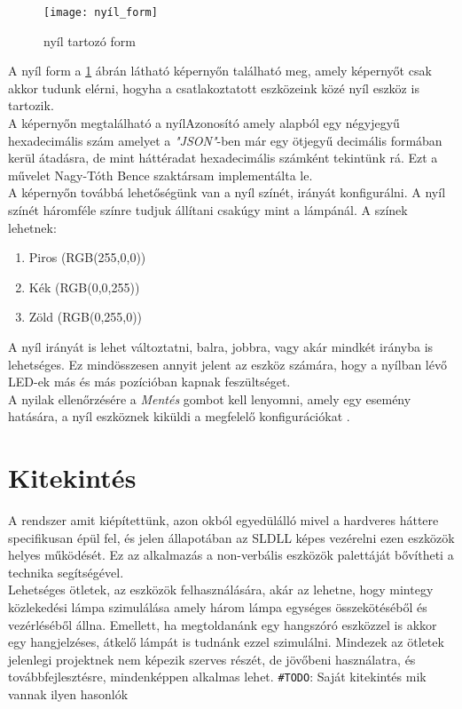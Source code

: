 \documentclass[tocnopagenum]{thesis-ekf}
\theoremstyle{definition}
\theoremstyle{remark}
\begin{document}
	\begin{figure}[h!]	
		\centering
		\texttt{[image: nyíl\_form]}
		\caption[nyil form]{nyíl tartozó form}
		\label{fig:nyilform}
	\end{figure}
	A nyíl form a \ref{fig:nyilform} ábrán látható képernyőn található meg, amely képernyőt csak akkor tudunk elérni, hogyha a csatlakoztatott eszközeink közé nyíl eszköz is tartozik.
	\\
	A képernyőn megtalálható a nyílAzonosító amely alapból egy négyjegyű hexadecimális szám amelyet a \textit{"JSON"}-ben már egy ötjegyű decimális formában kerül átadásra, de mint háttéradat hexadecimális számként tekintünk rá. Ezt a művelet Nagy-Tóth Bence szaktársam implementálta le. 
	\\
	A képernyőn továbbá lehetőségünk van a nyíl színét, irányát konfigurálni. A nyíl színét háromféle színre tudjuk állítani csakúgy mint a lámpánál.
	 A színek lehetnek:
	\begin{enumerate}
		\centering
		\item Piros (RGB(255,0,0))
		\item Kék (RGB(0,0,255))
		\item Zöld (RGB(0,255,0))
	\end{enumerate} 

	A nyíl irányát is lehet változtatni, balra, jobbra, vagy akár mindkét irányba is lehetséges. Ez mindösszesen annyit jelent az eszköz számára, hogy a nyílban lévő LED-ek más és más pozícióban kapnak feszültséget.
	\\
	A nyilak ellenőrzésére a \textit{Mentés} gombot kell lenyomni, amely egy esemény hatására, a nyíl eszköznek kiküldi a megfelelő konfigurációkat .
	

	\chapter*{Kitekintés}
	A rendszer amit kiépítettünk, azon okból egyedülálló mivel a hardveres háttere specifikusan épül fel, és jelen állapotában az SLDLL képes vezérelni ezen eszközök helyes működését. Ez az alkalmazás a non-verbális eszközök palettáját bővítheti a technika segítségével.
	\\
	Lehetséges ötletek, az eszközök felhasználására, akár az lehetne, hogy mintegy közlekedési lámpa szimulálása amely három lámpa egységes összekötéséből és vezérléséből állna. Emellett, ha megtoldanánk egy hangszóró eszközzel is akkor egy hangjelzéses, átkelő lámpát is tudnánk ezzel szimulálni.
	Mindezek az ötletek jelenlegi projektnek nem képezik szerves részét, de jövőbeni használatra, és továbbfejlesztésre, mindenképpen alkalmas lehet.
	\verb*|#TODO|: Saját kitekintés mik vannak ilyen hasonlók
	
\end{document}
